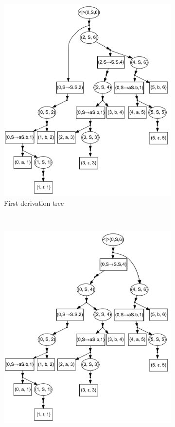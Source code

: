\begin{figure}[ht]
\begin{center}
\begin{subfigure}[b]{0.3\textwidth}
        \includegraphics[width=\textwidth]{dot/Brackets1.pdf}
        \caption{First derivation tree}
        \label{tree1}        
    \end{subfigure}
    ~
    \begin{subfigure}[b]{0.3\textwidth}
        \includegraphics[width=\textwidth]{dot/Brackets2.pdf}

\end{subfigure}
\end{center}
\end{figure}
